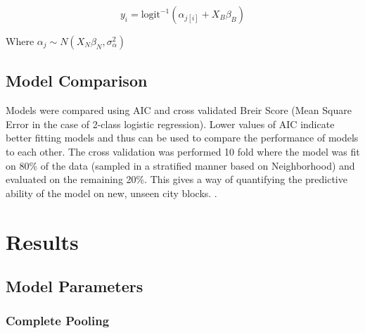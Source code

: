\documentclass{report}
\begin{document}
$$ y_{i} = \text{logit}^{-1}\left( \alpha_{j[i]} + X_{B}\beta_{B}  \right) $$

Where %
$\alpha_j \sim N(X_N \beta_N, \sigma^2_\alpha)$


\subsection*{Model Comparison}

Models were compared using AIC and cross validated Breir Score (Mean Square Error in the case of 2-class logistic regression). Lower values of AIC indicate better fitting models and thus can be used to compare the performance of models to each other. The cross validation was performed 10 fold where the model was fit on 80\% of the data (sampled in a stratified manner based on Neighborhood) and evaluated on the remaining 20\%. This gives a way of quantifying the predictive ability of the model on new, unseen city blocks. . 

\section*{Results}

\subsection*{Model Parameters}

\subsubsection*{Complete Pooling}
\end{document}
